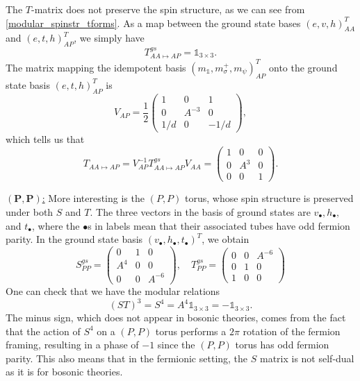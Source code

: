\documentclass[12pt,a4paper]{article}
\newcommand{\unit}{\mathds{1}}
\newcommand\be            {\begin{equation}}
\newcommand\ee            {\end{equation}}
\begin{document}
The $T$-matrix does not preserve the spin structure, as we can see from \eqref{modular_spinstr_tforms}. As a map between the ground state bases $(e,v,h)^T_{AA}$ and $(e,t,h)_{AP}^T$, we simply have
\be T_{AA\mapsto AP}^{gs} = \unit_{3\times 3}.\ee
The matrix mapping the idempotent basis $(m_\unit,m_\sigma^+,m_\psi)^T_{AP}$ onto the ground state basis $(e,t,h)_{AP}^T$  is
\be V_{AP} = \frac{1}{2} \begin{pmatrix} 1 & 0 & 1 \\ 0 & A^{-3} & 0 \\ 1/d & 0 & -1/d \end{pmatrix},\ee
which tells us that 
\be T_{AA\mapsto AP} = V_{AP}^{-1} T_{AA\mapsto AP}^{gs} V_{AA} =  \begin{pmatrix}
1 &0&0 \\ 0&A^3&0\\0&0&1
\end{pmatrix}.\ee


\underline{$\mathbf{(P,P)}$:} More interesting is the $(P,P)$ torus, whose spin structure is preserved under both $S$ and $T$. The three vectors in the basis of ground states are $v_\bullet,h_\bullet,$ and $t_\bullet$,
where the $\bullet$s in labels mean that their associated tubes have odd fermion parity.
In the ground state basis $(v_\bullet,h_\bullet,t_\bullet)^T$, we obtain
\be S^{gs}_{PP} = \begin{pmatrix}0 & 1 & 0 \\ A^4 & 0 & 0 \\ 0 & 0 & A^{-6} \end{pmatrix},\quad T^{gs}_{PP} = \begin{pmatrix} 0 & 0 & A^{-6} \\ 0 & 1 & 0 \\ 1 & 0 & 0 \end{pmatrix}\ee
One can check that we have the modular relations
\be (ST)^3 = S^4= A^4\unit_{3\times3} = -\unit_{3\times 3}.\ee 
The minus sign, which does not appear in bosonic theories, comes from the fact that the action of $S^4$ on a $(P,P)$ torus performs a $2\pi$ rotation of the fermion framing, resulting in a phase of $-1$ since the $(P,P)$ torus has odd fermion parity. This also means that in the fermionic setting, the $S$ matrix is not self-dual as it is for bosonic theories. %
\end{document}
